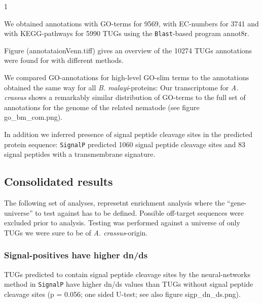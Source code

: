 \documentclass[10pt]{bmc_article}
\newenvironment{bmcformat}{\begin{raggedright}\baselineskip20pt\sloppy\setboolean{publ}{false}}{\end{raggedright}\baselineskip20pt\sloppy}
\begin{document}
\begin{bmcformat}

\begin{Schunk}
\begin{Soutput}
[1] 1
\end{Soutput}
\end{Schunk}



We obtained annotations with GO-terms for 9569, with EC-numbers
for 3741 and with KEGG-pathways for 5990 TUGs using
the \texttt{Blast}-based program annot8r.

Figure (annotataionVenn.tiff) gives an overview of the
10274 TUGs annotations were found for with
different methods.


We compared GO-annotations for high-level GO-slim terms to the
annotations obtained the same way for all \textit{B. malayi}-proteins:
Our transcriptome for \textit{A. crassus} shows a remarkably similar
distribution of GO-terms to the full set of annotations for the genome
of the related nematode (see figure go\_bm\_com.png).

In addition we inferred presence of signal peptide cleavage sites in
the predicted protein sequence: \texttt{SignalP} \cite{pmid21959131}
predicted 1060 signal peptide cleavage sites and
83 signal peptides with a transmembrane signature.

\subsection*{Consolidated results}







The following set of analyses, represetnt enrichment analysis where
the ``gene-universe'' to test against has to be defined. Possible
off-target sequences were excluded prior to analysis. Testing was
performed against a universe of only TUGs we were sure to be of
\textit{A. crassus}-origin.

\subsubsection*{Signal-positives have higher dn/ds}

TUGs predicted to contain signal peptide cleavage sites by the
neural-networks method in \texttt{SignalP} have higher dn/ds values
than TUGs without signal peptide cleavage sites (p =
0.056; one sided U-test; see also
figure sigp\_dn\_ds.png).


\end{bmcformat}
\end{document}
